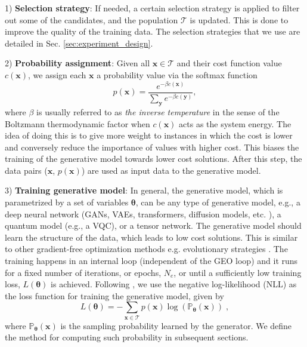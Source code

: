 1) \textbf{Selection strategy}: If needed, a certain selection strategy is applied to filter out some of the candidates, and the population $\mathcal {T}$ is updated. This is done to improve the quality of the training data. The selection strategies that we use are detailed in Sec. \ref{sec:experiment_design}.

2) \textbf{Probability assignment}: Given all $\mathbf{x}\in \mathcal{T}$ and their cost function value $c(\mathbf{x})$, we assign each $\mathbf{x}$ a probability value via the softmax function
\begin{equation}
     p(\mathbf{x}) = \frac{e^{-\beta c(\mathbf{x})}}{\sum_{\mathbf{y}} e^{-\beta c(\mathbf{y})}},
\end{equation}
where $\beta$ is usually referred to as \emph{the inverse temperature} in the sense of the Boltzmann thermodynamic factor when $c(\mathbf{x})$ acts as the system energy. The idea of doing this is to give more weight to instances in which the cost is lower and conversely reduce the importance of values with higher cost. This biases the training of the generative model towards lower cost solutions. After this step, the data pairs ($\mathbf{x}$, $p(\mathbf{x})$) are used as input data to the generative model.

3) \textbf{Training generative model}: In general, the generative model, which is parametrized by a set of variables $\boldsymbol{\theta}$, can be any type of generative model, e.g., a deep neural network (GANs, VAEs, transformers, diffusion models, etc. \cite{9555209}), a quantum model (e.g., a VQC), or a tensor network. The generative model should learn the structure of the data, which leads to low cost solutions. This is similar to other gradient-free optimization methods e.g. evolutionary strategies \cite{hansen2019pycma}. The training happens in an internal loop (independent of the GEO loop) and it runs for a fixed number of iterations, or epochs, $N_e$, or until a sufficiently low training loss, $L(\boldsymbol{\theta})$ is achieved. Following \cite{Alcazar2024}, we use the negative log-likelihood (NLL) as the loss function for training the generative model, given by
\begin{equation}
    L(\boldsymbol{\theta}) = -\sum_{\mathbf{x}\in\mathcal T}p(\mathbf{x})\log\left(\mathbb{P}_{\boldsymbol\theta}(\mathbf{x})\right)\;,
\label{eq:nll_loss}
\end{equation}
where $\mathbb{P}_{\boldsymbol\theta}(\mathbf{x})$ is the sampling probability learned by the generator. We define the method for computing such probability in subsequent sections.

